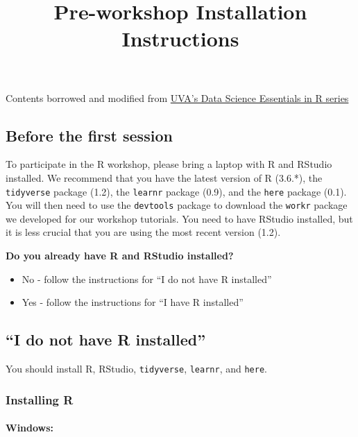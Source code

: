 \documentclass[
]{article}
\title{Pre-workshop Installation Instructions}
\author{}
\date{\vspace{-2.5em}}
\providecommand{\tightlist}{%
  \setlength{\itemsep}{0pt}\setlength{\parskip}{0pt}}
\begin{document}
\maketitle

Contents borrowed and modified from
\href{https://uvastatlab.github.io/phdplus/intror.html}{UVA's Data
Science Essentials in R series}

\hypertarget{before-the-first-session}{%
\subsection{Before the first session}\label{before-the-first-session}}

To participate in the R workshop, please bring a laptop with R and
RStudio installed. We recommend that you have the latest version of R
(3.6.*), the \texttt{tidyverse} package (1.2), the \texttt{learnr}
package (0.9), and the \texttt{here} package (0.1). You will then need
to use the \texttt{devtools} package to download the \texttt{workr}
package we developed for our workshop tutorials. You need to have
RStudio installed, but it is less crucial that you are using the most
recent version (1.2).

\textbf{Do you already have R and RStudio installed?}

\begin{itemize}
\tightlist
\item
  No - follow the instructions for ``I do not have R installed''\\
\item
  Yes - follow the instructions for ``I have R installed''
\end{itemize}

\hypertarget{i-do-not-have-r-installed}{%
\subsection{``I do not have R
installed''}\label{i-do-not-have-r-installed}}

You should install R, RStudio, \texttt{tidyverse}, \texttt{learnr}, and
\texttt{here}.

\hypertarget{installing-r}{%
\subsubsection{Installing R}\label{installing-r}}

\hypertarget{windows}{%
\paragraph{Windows:}\label{windows}}
\end{document}
